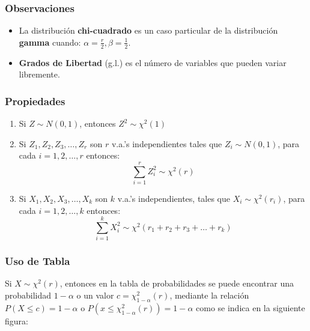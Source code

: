 \subsubsection{Observaciones}
\begin{itemize}
\item La distribución \textbf{chi-cuadrado} es un caso particular de la distribución \textbf{gamma} cuando: $\alpha = \frac{r}{2},\beta = \frac{1}{2}$.
\item \textbf{Grados de Libertad} (g.l.) es el número de variables que pueden variar libremente.
\end{itemize}
\subsubsection{Propiedades}
\begin{enumerate}
\item Si $Z\sim N(0,1)$, entonces $Z^2 \sim \chi^2(1)$
\item Si $Z_1,Z_2,Z_3,\ldots,Z_r$ son $r$ v.a.'s independientes tales que $ Z_i\sim N(0,1) $, para cada $i=1,2,\ldots,r$ entonces:
$$ \displaystyle\sum_{i=1}^r Z_{i}^2\sim \chi^2(r) $$
\item Si $X_1,X_2,X_3,\ldots,X_k$ son $k$ v.a.'s independientes, tales que  $X_i\sim \chi^2(r_i)$, para cada $i=1,2,\ldots,k$ entonces:
$$ \displaystyle\sum_{i=1}^k X_{i}^2\sim \chi^2(r_1 + r_2 + r_3 + \ldots + r_k) $$
\end{enumerate}
\subsubsection{Uso de Tabla}
Si $X\sim\chi^2(r)$, entonces en la tabla de probabilidades se puede encontrar una probabilidad $1-\alpha$ o un valor $c = \chi_{1-\alpha}^2(r)$, mediante la relación $P(X\leq c) = 1-\alpha$ o $P(x\leq \chi_{1-\alpha}^2(r)) = 1-\alpha$ como se indica en la siguiente figura:

